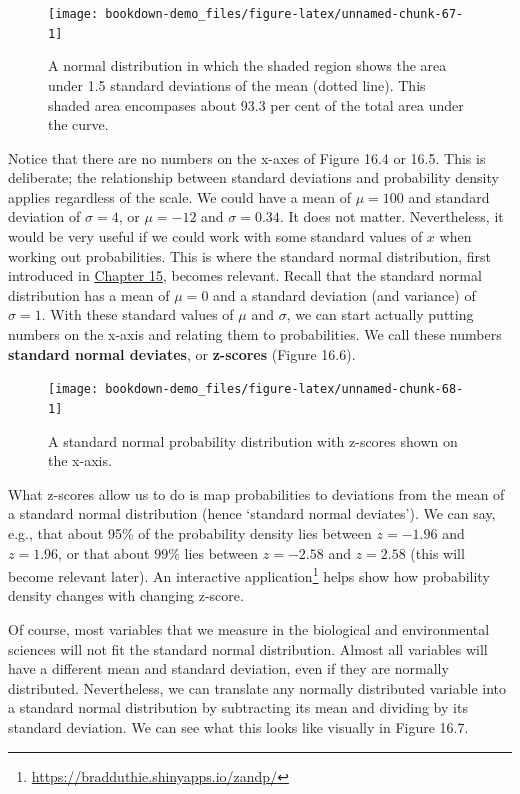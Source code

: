 \documentclass[
]{scrbook}
\begin{document}
\begin{figure}
\texttt{[image: bookdown-demo\_files/figure-latex/unnamed-chunk-67-1]} \caption{A normal distribution in which the shaded region shows the area under 1.5 standard deviations of the mean (dotted line). This shaded area encompases about 93.3 per cent of the total area under the curve.}\label{fig:unnamed-chunk-67}
\end{figure}

Notice that there are no numbers on the x-axes of Figure 16.4 or 16.5.
This is deliberate; the relationship between standard deviations and probability density applies regardless of the scale.
We could have a mean of \(\mu = 100\) and standard deviation of \(\sigma = 4\), or \(\mu = -12\) and \(\sigma = 0.34\).
It does not matter.
Nevertheless, it would be very useful if we could work with some standard values of \(x\) when working out probabilities.
This is where the standard normal distribution, first introduced in \protect\hyperlink{Chapter_15}{Chapter 15}, becomes relevant.
Recall that the standard normal distribution has a mean of \(\mu = 0\) and a standard deviation (and variance) of \(\sigma = 1\).
With these standard values of \(\mu\) and \(\sigma\), we can start actually putting numbers on the x-axis and relating them to probabilities.
We call these numbers \textbf{standard normal deviates}, or \textbf{z-scores} (Figure 16.6).

\begin{figure}
\texttt{[image: bookdown-demo\_files/figure-latex/unnamed-chunk-68-1]} \caption{A standard normal probability distribution with z-scores shown on the x-axis.}\label{fig:unnamed-chunk-68}
\end{figure}

What z-scores allow us to do is map probabilities to deviations from the mean of a standard normal distribution (hence `standard normal deviates').
We can say, e.g., that about 95\% of the probability density lies between \(z = -1.96\) and \(z = 1.96\), or that about 99\% lies between \(z = -2.58\) and \(z = 2.58\) (this will become relevant later).
An interactive application\footnote{\url{https://bradduthie.shinyapps.io/zandp/}} helps show how probability density changes with changing z-score.

Of course, most variables that we measure in the biological and environmental sciences will not fit the standard normal distribution.
Almost all variables will have a different mean and standard deviation, even if they are normally distributed.
Nevertheless, we can translate any normally distributed variable into a standard normal distribution by subtracting its mean and dividing by its standard deviation.
We can see what this looks like visually in Figure 16.7.
\end{document}
